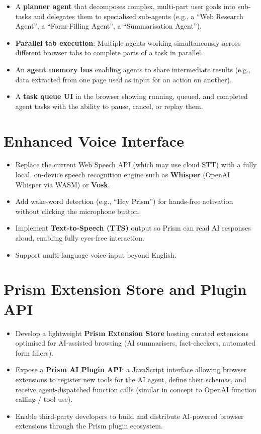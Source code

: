 \begin{itemize}[leftmargin=*]
    \item A \textbf{planner agent} that decomposes complex, multi-part user goals into sub-tasks and delegates them to specialised sub-agents (e.g., a ``Web Research Agent'', a ``Form-Filling Agent'', a ``Summarisation Agent'').
    \item \textbf{Parallel tab execution}: Multiple agents working simultaneously across different browser tabs to complete parts of a task in parallel.
    \item An \textbf{agent memory bus} enabling agents to share intermediate results (e.g., data extracted from one page used as input for an action on another).
    \item A \textbf{task queue UI} in the browser showing running, queued, and completed agent tasks with the ability to pause, cancel, or replay them.
\end{itemize}

\section{Enhanced Voice Interface}
\begin{itemize}[leftmargin=*]
    \item Replace the current Web Speech API (which may use cloud STT) with a fully local, on-device speech recognition engine such as \textbf{Whisper} (OpenAI Whisper via WASM) or \textbf{Vosk}.
    \item Add wake-word detection (e.g., ``Hey Prism'') for hands-free activation without clicking the microphone button.
    \item Implement \textbf{Text-to-Speech (TTS)} output so Prism can read AI responses aloud, enabling fully eyes-free interaction.
    \item Support multi-language voice input beyond English.
\end{itemize}

\section{Prism Extension Store and Plugin API}
\begin{itemize}[leftmargin=*]
    \item Develop a lightweight \textbf{Prism Extension Store} hosting curated extensions optimised for AI-assisted browsing (AI summarisers, fact-checkers, automated form fillers).
    \item Expose a \textbf{Prism AI Plugin API}: a JavaScript interface allowing browser extensions to register new tools for the AI agent, define their schemas, and receive agent-dispatched function calls (similar in concept to OpenAI function calling / tool use).
    \item Enable third-party developers to build and distribute AI-powered browser extensions through the Prism plugin ecosystem.
\end{itemize}

